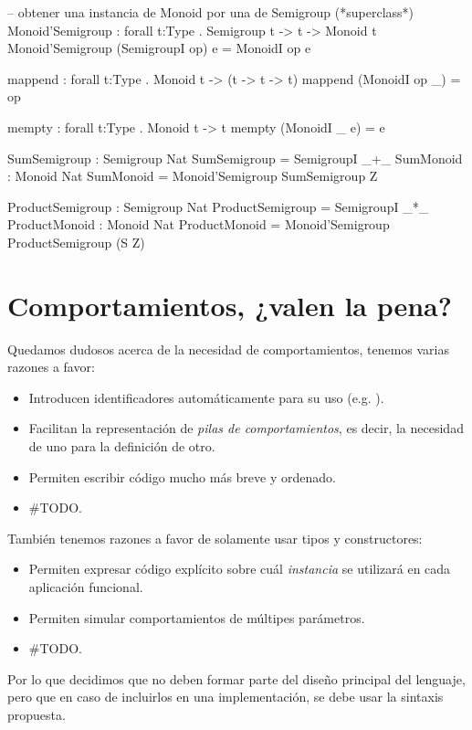 {\begin{designfr}
\begin{anglercode}
-- obtener una instancia de Monoid por una de Semigroup (*superclass*)
Monoid'Semigroup : forall t:Type . Semigroup t -> t -> Monoid t
Monoid'Semigroup (SemigroupI op) e = MonoidI op e

mappend : forall t:Type . Monoid t -> (t -> t -> t)
mappend (MonoidI op _) = op

mempty : forall t:Type . Monoid t -> t
mempty (MonoidI _ e) = e

SumSemigroup : Semigroup Nat
SumSemigroup = SemigroupI _+_
SumMonoid : Monoid Nat
SumMonoid = Monoid'Semigroup SumSemigroup Z

ProductSemigroup : Semigroup Nat
ProductSemigroup = SemigroupI _*_
ProductMonoid : Monoid Nat
ProductMonoid = Monoid'Semigroup ProductSemigroup (S Z)
\end{anglercode}
\end{designfr}

\section{Comportamientos, ¿valen la pena?}

\begin{designfr}
Quedamos dudosos acerca de la necesidad de comportamientos, tenemos varias razones a favor:

\begin{itemize}
    \item Introducen identificadores automáticamente para su uso (e.g. ).
    \item Facilitan la representación de \emph{pilas de comportamientos}, es decir, la necesidad de uno para la definición de otro.
    \item Permiten escribir código mucho más breve y ordenado.
    \item \#TODO.
\end{itemize}

También tenemos razones a favor de solamente usar tipos y constructores:

\begin{itemize}
    \item Permiten expresar código explícito sobre cuál \emph{instancia} se utilizará en cada aplicación funcional.
    \item Permiten simular comportamientos de múltipes parámetros.
    \item \#TODO.
\end{itemize}

Por lo que decidimos que no deben formar parte del diseño principal del lenguaje, pero que en caso de incluirlos en una implementación, se debe usar la sintaxis propuesta.
\end{designfr}

}
